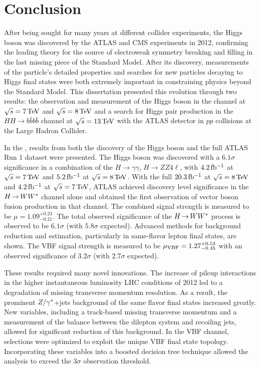 \chapter{Conclusion}
\label{conclusion}

After being sought for many years at different collider experiments, the Higgs boson was discovered by the ATLAS and CMS experiments in 2012, confirming the leading theory for the source of electroweak symmetry breaking and filling in the last missing piece of the Standard Model. After its discovery, measurements of the particle's detailed properties and searches for new particles decaying to Higgs final states were both extremely important in constraining physics beyond the Standard Model. This dissertation presented this evolution through two results: the observation and measurement of the Higgs boson in the \HWWfull channel at $\sqrt{s} = 7 \TeV$ and $\sqrt{s} = 8 \TeV$ and a search for Higgs pair production in the $HH\to b\bar{b}b\bar{b}$ channel at $\sqrt{s} = 13 \TeV$ with the ATLAS detector in $pp$ collisions at the Large Hadron Collider.

In the \HWWfull, results from both the discovery of the Higgs boson and the full ATLAS Run 1 dataset were presented. The Higgs boson was discovered with a $6.1\sigma$ significance in a combination of the $H\to\gamma\gamma$, $H\to ZZ 4\ell$, \HWWfull with $4.2\mbox{\,fb$^{-1}$}$ at $\sqrt{s} = 7 \TeV$ and $5.2\mbox{\,fb$^{-1}$}$ at $\sqrt{s} = 8 \TeV$. With the full $20.3\mbox{\,fb$^{-1}$}$ at $\sqrt{s} =  8 \TeV$ and $4.2\mbox{\,fb$^{-1}$}$ at $\sqrt{s} = 7 \TeV$, ATLAS achieved discovery level significance in the $H{\,{\rightarrow}\,}WW^\ast$ channel alone and obtained the first observation of vector boson fusion production in that channel. The combined signal strength is measured to be $\mu = 1.09^{+0.23}_{-0.21}$. The total observed significance of the $H{\,{\rightarrow}\,}WW^\ast$ process is observed to be $6.1\sigma$ (with $5.8 \sigma$ expected). Advanced methods for background reduction and estimation, particularly in same-flavor lepton final states, are shown. The VBF signal strength is measured to be $\mu_{\rm VBF} = 1.27^{+0.53}_{-0.45}$ with an observed significance of $3.2\sigma$ (with $2.7 \sigma$ expected). 

These results required many novel innovations. The increase of pileup interactions in the higher instantaneous luminosity LHC conditions of 2012 led to a degradation of missing transverse momentum resolution. As a result, the prominent $Z/\gamma^{\ast}$+jets background of the same flavor \HWWfull final states increased greatly. New variables, including a track-based missing transverse momentum and a measurement of the balance between the dilepton system and recoiling jets, allowed for significant reduction of this background. In the VBF channel, selections were optimized to exploit the unique VBF final state topology. Incorporating these variables into a boosted decision tree technique allowed the analysis to exceed the $3\sigma$ observation threshold.

